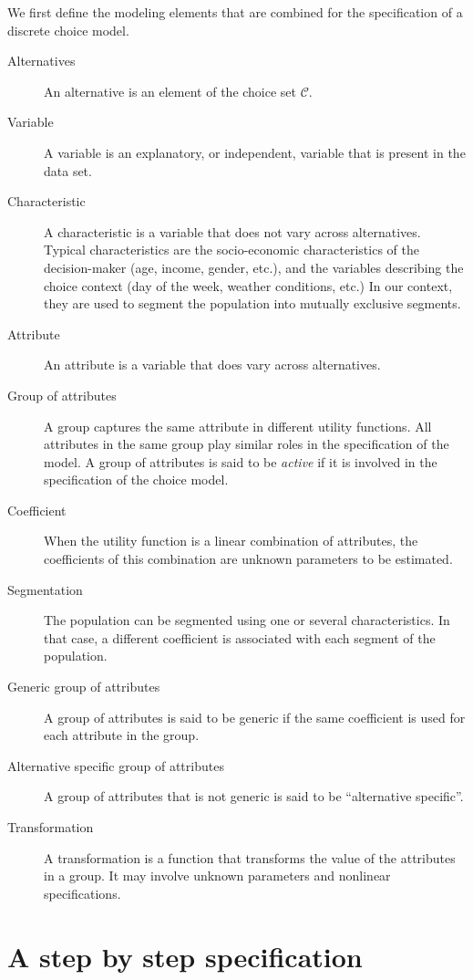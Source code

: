 \documentclass[12pt,a4paper]{article}
\newcommand{\C}{\mathcal{C}}
\begin{document}
We first define the modeling elements that are combined for the
specification of a discrete choice model.

\begin{description}
\item[Alternatives] An alternative is an element of the choice
  set $\C$.
\item[Variable] A variable is an explanatory, or independent, variable that is
  present in the data set. 
\item[Characteristic] A characteristic is a variable that does not
  vary across alternatives. Typical characteristics are the
  socio-economic characteristics of the decision-maker (age, income,
  gender, etc.), and the variables describing the choice context
  (day of the week, weather conditions, etc.) In our context, they
  are used to segment the population into mutually exclusive segments.
\item[Attribute] An attribute is a variable that does vary across
  alternatives.
\item[Group of attributes] A group captures the same attribute in
  different utility functions. All attributes in the same group play
  similar roles in the specification of the model. A group of
  attributes is said to be \emph{active} if it is involved in the
  specification of the choice model.
\item[Coefficient] When the utility function is a linear combination
  of attributes, the coefficients of this combination are unknown
  parameters to be estimated.
\item[Segmentation] The population can be segmented using one or
  several characteristics. In that case, a different coefficient is
  associated with each segment of the population.
\item[Generic group of attributes] A group of attributes is said to
  be generic if the same coefficient is used for each attribute in
  the group.
\item[Alternative specific group of attributes] A group of  attributes that is not
  generic is said to be ``alternative specific''. 
\item[Transformation] A transformation is a function that transforms the value
  of the attributes in a group. It may involve unknown parameters and
  nonlinear specifications. 
\end{description}

\section{A step by step specification}
\end{document}
